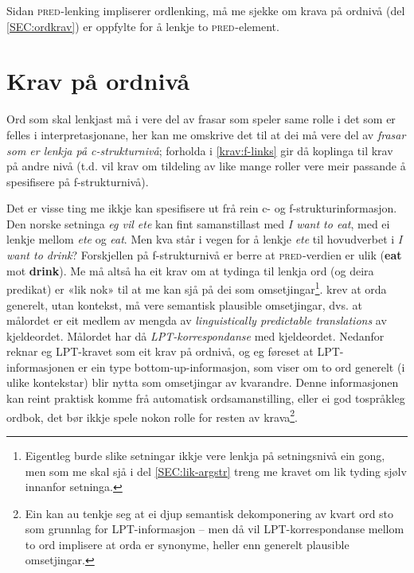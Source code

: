 \documentclass[12pt,a4paper,oneside,draft]{report}
\newcommand{\F}[2]{\textsc{#1}\ensuremath{_{#2}}}
\newcommand{\PRED}{\F{pred}{}}
\begin{document}
Sidan \PRED{}-lenking impliserer ordlenking, må me sjekke om krava
 på ordnivå (del \ref{SEC:ordkrav}) er oppfylte for å lenkje to
 \PRED{}-element.

\section{Krav på ordnivå}
\label{sec-3.5}

\label{SEC:ordkrav}

Ord som skal lenkjast må i \cite{thunes2003eal} vere del av frasar som
speler same rolle i det som er felles i interpretasjonane, her kan me
omskrive det til at dei må vere del av \emph{frasar som er lenkja på c\hyp{}strukturnivå}; forholda i \ref{krav:f-links} gir då koplinga til krav på
andre nivå (t.d. vil krav om tildeling av like mange roller vere
meir passande å spesifisere på f\hyp{}strukturnivå).

Det er visse ting me ikkje kan spesifisere ut frå rein c- og
 f\hyp{}strukturinformasjon. Den norske setninga \emph{eg vil ete} kan fint
 samanstillast med \emph{I want to eat}, med ei lenkje mellom \emph{ete} og
 \emph{eat}. Men kva står i vegen for å lenkje \emph{ete} til hovudverbet i \emph{I  want to drink}? Forskjellen på f\hyp{}strukturnivå er berre at
 \PRED{}-verdien er ulik (\textbf{eat} mot \textbf{drink}). Me må altså ha eit krav
 om at tydinga til lenkja ord (og deira predikat) er «lik nok» til at
 me kan sjå på dei som omsetjingar\footnote{Eigentleg burde slike setningar ikkje vere lenkja på
        setningsnivå ein gong, men som me skal sjå i del
        \ref{SEC:lik-argstr} treng me kravet om lik tyding 
        sjølv innanfor setninga. }. \citet[s.~74]{dyvik2009lmp}
 krev at orda generelt, utan kontekst, må vere semantisk plausible
 omsetjingar, dvs. at målordet er eit medlem av mengda av
 \emph{linguistically predictable translations} av kjeldeordet. Målordet
 har då \emph{LPT\hyp{}korrespondanse} med kjeldeordet.  Nedanfor reknar eg
 LPT-kravet som eit krav på ordnivå, og eg føreset at
 LPT\hyp{}informasjonen er ein type bottom-up-informasjon, som viser om to
 ord generelt (i ulike kontekstar) blir nytta som omsetjingar av
 kvarandre. Denne informasjonen kan reint praktisk komme frå
 automatisk ordsamanstilling, eller ei god tospråkleg ordbok, det bør
 ikkje spele nokon rolle for resten av krava\footnote{Ein kan au tenkje seg at ei djup semantisk dekomponering av
        kvart ord sto som grunnlag for LPT\hyp{}informasjon -- men då vil
        LPT\hyp{}korrespondanse mellom to ord implisere at orda er
        synonyme, heller enn generelt plausible omsetjingar. }.
\end{document}
